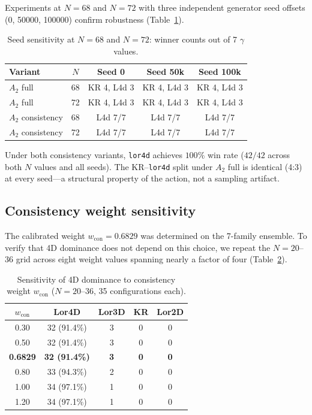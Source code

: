 \documentclass[12pt,a4paper]{article}
\begin{document}
Experiments at $N = 68$ and $N = 72$ with three independent generator seed
offsets (0, 50000, 100000) confirm robustness (Table~\ref{tab:seed}).

\begin{table}[h]
\centering
\caption{Seed sensitivity at $N = 68$ and $N = 72$: winner counts out of 7
$\gamma$ values.}
\label{tab:seed}
\begin{tabular}{lcccc}
\toprule
\textbf{Variant} & $N$ & \textbf{Seed 0} & \textbf{Seed 50k} &
\textbf{Seed 100k} \\
\midrule
$A_2$ full & 68 & KR 4, L4d 3 & KR 4, L4d 3 & KR 4, L4d 3 \\
$A_2$ full & 72 & KR 4, L4d 3 & KR 4, L4d 3 & KR 4, L4d 3 \\
$A_2$ consistency & 68 & L4d 7/7 & L4d 7/7 & L4d 7/7 \\
$A_2$ consistency & 72 & L4d 7/7 & L4d 7/7 & L4d 7/7 \\
\bottomrule
\end{tabular}
\end{table}

Under both consistency variants, \texttt{lor4d} achieves $100\%$ win rate
($42/42$ across both $N$ values and all seeds). The KR--\texttt{lor4d} split
under $A_2$ full is identical (4:3) at every seed---a structural property of
the action, not a sampling artifact.

\subsection{Consistency weight sensitivity}
\label{sec:wcon}

The calibrated weight $w_{\text{con}} = 0.6829$ was determined on the 7-family
ensemble. To verify that 4D dominance does not depend on this choice, we repeat
the $N = 20$--$36$ grid across eight weight values spanning nearly a factor of
four (Table~\ref{tab:wcon}).

\begin{table}[h]
\centering
\caption{Sensitivity of 4D dominance to consistency weight $w_{\text{con}}$
($N = 20$--$36$, 35 configurations each).}
\label{tab:wcon}
\begin{tabular}{ccccc}
\toprule
$w_{\text{con}}$ & \textbf{Lor4D} & \textbf{Lor3D} & \textbf{KR} &
\textbf{Lor2D} \\
\midrule
0.30 & 32 (91.4\%) & 3 & 0 & 0 \\
0.50 & 32 (91.4\%) & 3 & 0 & 0 \\
\textbf{0.6829} & \textbf{32 (91.4\%)} & \textbf{3} & \textbf{0} & \textbf{0} \\
0.80 & 33 (94.3\%) & 2 & 0 & 0 \\
1.00 & 34 (97.1\%) & 1 & 0 & 0 \\
1.20 & 34 (97.1\%) & 1 & 0 & 0 \\
\bottomrule
\end{tabular}
\end{table}
\end{document}

